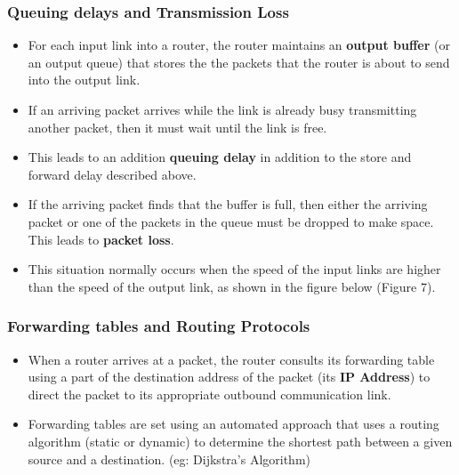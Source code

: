 \documentclass{article}
\theoremstyle{plain}
\theoremstyle{definition}
\begin{document}
    \subsubsection{Queuing delays and Transmission Loss}
    \begin{itemize}
        \item For each input link into a router, the router maintains an \textbf{output buffer} (or an output queue) that stores the the packets that the router is about to send into the output link.
        
        \item If an arriving packet arrives while the link is already busy transmitting another packet, then it must wait until the link is free. 
        
        \item This leads to an addition \textbf{queuing delay} in addition to the store and forward delay described above. 
        
        \item If the arriving packet finds that the buffer is full, then either the arriving packet or one of the packets in the queue must be dropped to make space. This leads to \textbf{packet loss}.
        
        \item This situation normally occurs when the speed of the input links are higher than the speed of the output link, as shown in the figure below (Figure 7).
    \end{itemize}
    
    \subsubsection{Forwarding tables and Routing Protocols}
    \begin{itemize}
        \item When a router arrives at a packet, the router consults its forwarding table using a part of the destination address of the packet (its \textbf{IP Address}) to direct the packet to its appropriate outbound communication link. 
        
        \item Forwarding tables are set using an automated approach that uses a routing algorithm (static or dynamic) to determine the shortest path between a given source and a destination. (eg: Dijkstra's Algorithm)
    \end{itemize}
    
\end{document}
